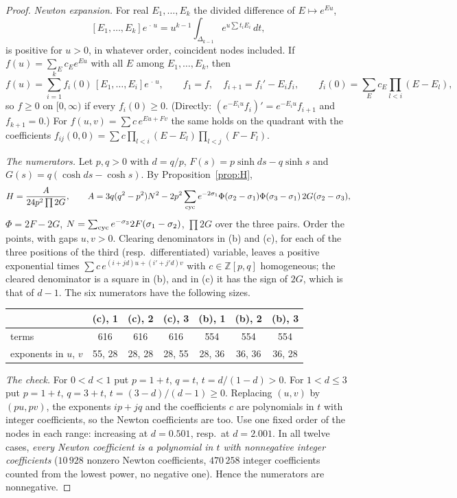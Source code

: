 \documentclass[11pt]{amsart}
\theoremstyle{definition}
\numberwithin{equation}{section}
\begin{document}
\begin{proof}
\emph{Newton expansion.} For real $E_1,\dots,E_k$ the divided difference of $E\mapsto e^{Eu}$,\[[E_1,\dots,E_k]e^{\,\cdot\,u}=u^{k-1}\int_{\Delta_{k-1}}e^{u\sum t_iE_i}\,dt,\]is positive for $u>0$, in whatever order, coincident nodes included. If
$f(u)=\sum_Ec_Ee^{Eu}$ with all $E$ among $E_1,\dots,E_k$, then
\begin{equation}\label{eq:newton}
f(u)=\sum_{i=1}^kf_{i}(0)\,[E_1,\dots,E_i]e^{\,\cdot\,u},\qquad f_1=f,\quad f_{i+1}=f_i'-E_if_i,\qquad f_i(0)=\sum_Ec_E\prod_{l<i}(E-E_l),
\end{equation}
so $f\ge0$ on $[0,\infty)$ if every $f_i(0)\ge0$. (Directly: $(e^{-E_iu}f_i)'=e^{-E_iu}f_{i+1}$ and $f_{k+1}=0$.) For $f(u,v)=\sum c\,e^{Eu+Fv}$ the same holds on the quadrant with the coefficients $f_{ij}(0,0)=\sum c\prod_{l<i}(E-E_l)\prod_{l<j}(F-F_l)$.

\emph{The numerators.} Let $p,q>0$ with $d=q/p$, $F(s)=p\sinh ds-q\sinh s$ and $G(s)=q(\cosh ds-\cosh s)$. By Proposition~\ref{prop:H},
\begin{gather*}
H=\frac{A}{24p^2\prod2G},\qquad A=3q(q^2-p^2)N^2-2p^2\sum_{\rm cyc}e^{-2\sigma_1}\Phi(\sigma_2-\sigma_1)\Phi(\sigma_3-\sigma_1)\,2G(\sigma_2-\sigma_3),
\end{gather*}
$\Phi=2F-2G$, $N=\sum_{\rm cyc}e^{-\sigma_3}2F(\sigma_1-\sigma_2)$, $\prod 2G$ over the three pairs. Order the points, with gaps $u,v>0$. Clearing denominators in (b) and (c), for each of the three positions of the third (resp.\ differentiated) variable, leaves
a positive exponential times $\sum c\,e^{(i+jd)u+(i'+j'd)v}$ with $c\in\mathbb Z[p,q]$ homogeneous; the cleared denominator is a square in (b), and in (c) it has the sign of $2G$, which is that of $d-1$. The six numerators have the following sizes.
\begin{center}
\begin{tabular}{lcccccc}
\toprule
& (c), 1 & (c), 2 & (c), 3 & (b), 1 & (b), 2 & (b), 3\\
\midrule
terms & 616 & 616 & 616 & 554 & 554 & 554\\
exponents in $u$, $v$ & 55, 28 & 28, 28 & 28, 55 & 28, 36 & 36, 36 & 36, 28\\
\bottomrule
\end{tabular}
\end{center}

\emph{The check.} For $0<d<1$ put $p=1+t$, $q=t$, $t=d/(1-d)>0$. For $1<d\le3$ put $p=1+t$, $q=3+t$, $t=(3-d)/(d-1)\ge0$. Replacing $(u,v)$ by $(pu,pv)$, the exponents $ip+jq$ and the coefficients $c$ are polynomials in $t$ with integer coefficients, so
the Newton coefficients are too. Use one fixed order of the nodes in each range: increasing at $d=0.501$, resp.\ at $d=2.001$. In all twelve cases, \emph{every Newton coefficient is a polynomial in $t$ with
nonnegative integer coefficients} ($10\,928$ nonzero Newton coefficients, $470\,258$ integer coefficients counted from the lowest power, no negative one). Hence the numerators are nonnegative.
\end{proof}
\end{document}
